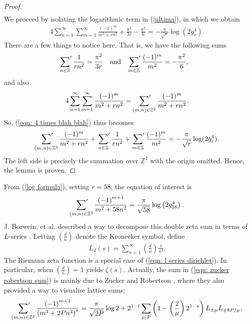\documentclass[11pt]{amsart}
\theoremstyle{definition}
\numberwithin{theorem}{section}
\begin{document}
\begin{proof}
\begin{align}
\end{align}
We proceed by isolating the logarithmic term in (\ref{ultima}), in which we obtain
\begin{align*}
    4\sum_{n=1}^\infty\sum_{m=1}^\infty \frac{(-1)^m}{m^2+rn^2} +\frac{\pi^2}{3r}- \frac{\pi^2}{6} =   - \frac{\pi}{\sqrt{r}}\log(2g_r^4).
\end{align*}
There are a few things to notice here. That is, we have the following sums
\begin{align*}
    \sideset{}{'}\sum_{n\in \mathbb Z} \frac{1}{rn^2} = \frac{\pi^2}{3r}\quad\text{and}\quad 
    \sideset{}{'}\sum_{m\in \mathbb Z} \frac{(-1)^m}{m^2} &= -\frac{\pi^2}{6},
\end{align*}
and also
\begin{align*}
    4\sum_{n=1}^\infty\sum_{m=1}^\infty \frac{(-1)^m}{m^2+rn^2} = \sideset{}{'}\sum_{\left(m,n\right)\in\mathbb Z^2} \frac{(-1)^m}{m^2+rn^2}.
\end{align*}
So, (\ref{eqn: 4 times blah blah}) thus becomes
\begin{align*}
    \sideset{}{'}\sum_{\left(m,n\right)\in\mathbb Z^2} \frac{(-1)^m}{m^2+rn^2} + \sideset{}{'}\sum_{n\in \mathbb Z} \frac{1}{rn^2} + \sideset{}{'}\sum_{m\in \mathbb Z} \frac{(-1)^m}{m^2} = -\frac{\pi}{\sqrt{r}} \log(2g_r^4). 
\end{align*}
The left side is precisely the summation over $\mathbb Z^2$ with the origin omitted. Hence, the lemma is proven.
\end{proof}
From (\ref{log formula}), setting $r=58$, the equation of interest is \begin{align*}
    \sideset{}{'}\sum_{\left(m,n\right)\in \mathbb Z^2}\frac{\left(-1\right)^{m+1}}{m^2+58n^2}=\frac{\pi}{\sqrt{58}}\operatorname{log}\left(2g_{58}^4\right).
\end{align*}
J. Borwein, et al. described a way to decompose this double zeta sum in terms of $L$-series \cite{lattice sums}. Letting $\left(\frac{d}{n}\right)$ denote the Kronecker symbol, define \begin{align}\label{eqn: l series dirichlet}
    L_d\left(s\right)=\sum_{n=1}^{\infty}\left(\frac{d}{n}\right)\frac{1}{n^s}.
\end{align}
The Riemann zeta function is a special case of (\ref{eqn: l series dirichlet}). In particular, when $\left(\frac{d}{n}\right)=1$ yields $\zeta\left(s\right)$. Actually, the sum in (\ref{eqn: zucker robertson sum}) is mainly due to Zucker and Robertson \cite{zucker}, where they also provided a way to visualise lattice sums:  \begin{align}\label{eqn: zucker robertson sum}
    \sideset{}{'}\sum_{\left(m,n\right)\in \mathbb Z^2}\frac{\left(-1\right)^{m+1}}{\left(m^2+2Pn^2\right)^s}=\frac{\pi}{\sqrt{2P}}\operatorname{log}2+2^{1-t}\sum_{\mu\mid P}\left(1-\left(\frac{2}{\mu}\right)2^{1-s}\right)L_{\pm \mu}L_{\mp 8P/\mu},
\end{align}
\end{document}

